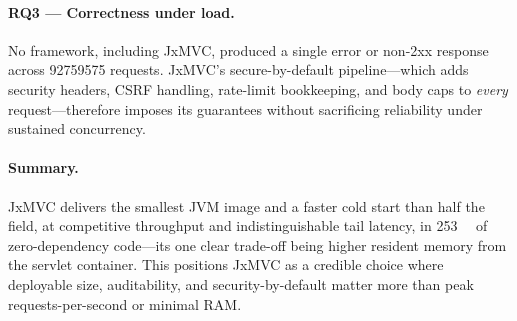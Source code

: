 \paragraph{RQ3 --- Correctness under load.} No framework, including
JxMVC, produced a single error or non-2xx response across
\num{92759575} requests. JxMVC's secure-by-default pipeline---which
adds security headers, CSRF handling, rate-limit bookkeeping, and body
caps to \emph{every} request---therefore imposes its guarantees
without sacrificing reliability under sustained concurrency.

\paragraph{Summary.} JxMVC delivers the smallest JVM image and a
faster cold start than half the field, at competitive throughput and
indistinguishable tail latency, in \SI{253}{\kilo\byte} of
zero-dependency code---its one clear trade-off being higher resident
memory from the servlet container. This positions JxMVC as a credible
choice where deployable size, auditability, and security-by-default
matter more than peak requests-per-second or minimal RAM.

